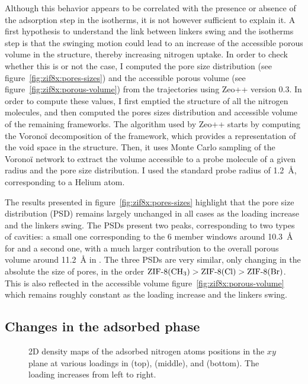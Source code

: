 \documentclass[thesis]{subfiles}
\begin{document}
Although this behavior appears to be correlated with the presence or absence of
the adsorption step in the isotherms, it is not however sufficient to explain
it. A first hypothesis to understand the link between linkers swing and the
isotherms step is that the swinging motion could lead to an increase of the
accessible porous volume in the structure, thereby increasing nitrogen uptake.
In order to check whether this is or not the case, I computed the pore size
distribution (see figure~\ref{fig:zif8x:pores-sizes}) and the accessible porous
volume (see figure~\ref{fig:zif8x:porous-volume}) from the trajectories using
Zeo++\cite{Willems2012} version 0.3. In order to compute these values, I first
emptied the structure of all the nitrogen molecules, and then computed the pores
sizes distribution and accessible volume of the remaining frameworks. The
algorithm used by Zeo++ starts by computing the Voronoï decomposition of the
framework, which provides a representation of the void space in the structure.
Then, it uses Monte Carlo sampling of the Voronoï network to extract the volume
accessible to a probe molecule of a given radius and the pore size distribution.
I used the standard probe radius of \SI{1.2}{\AA}, corresponding to a Helium
atom.

The results presented in figure~\ref{fig:zif8x:pores-sizes} highlight that the
pore size distribution (PSD) remains largely unchanged in all cases as the
loading increase and the linkers swing. The PSDs present two peaks,
corresponding to two types of cavities: a small one corresponding to the 6
member windows around \SI{10.3}{\AA} for  and a second one, with a much
larger contribution to the overall porous volume around \SI{11.2}{\AA} in
. The three PSDs are very similar, only changing in the absolute the
size of pores, in the order $\text{\ZIFCH3} > \text{\ZIFCl} > \text{\ZIFBr}$.
This is also reflected in the accessible volume
figure~\ref{fig:zif8x:porous-volume} which remains roughly constant as the
loading increase and the linkers swing.

\subsection{Changes in the adsorbed phase}

\begin{figure}[ht]
    \centering
    
    \caption{2D density maps of the adsorbed nitrogen atoms positions in the $xy$
    plane at various loadings in  (top), \ZIFCl (middle), and \ZIFBr
    (bottom). The loading increases from left to right.}
    \label{fig:zif8x:density}
\end{figure}
\end{document}
